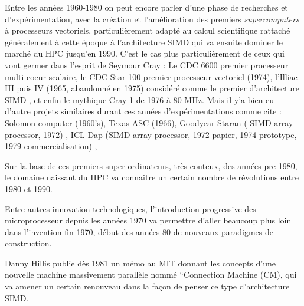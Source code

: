 Entre les années 1960-1980 on peut encore parler d'une phase de recherches et d'expérimentation, avec la création et l'amélioration des premiers \textit{supercomputers} à processeurs vectoriels, particulièrement adapté au calcul scientifique rattaché généralement à cette époque à l'architecture SIMD  qui va ensuite dominer le marché du HPC jusqu'en 1990. C'est le cas plus particulièrement de ceux qui vont germer dans l'esprit de Seymour Cray : Le CDC 6600 premier processeur multi-coeur scalaire, le CDC Star-100 premier processeur vectoriel (1974), l'Illiac III puis IV (1965, abandonné en 1975) considéré comme le premier d'architecture SIMD \autocite{Muraoka2012}, et enfin le mythique Cray-1 de 1976 à  80 MHz. Mais il y'a bien eu d'autre projets similaires durant ces années d'expérimentations comme cite \textcite[387-388]{Steele2011} : Solomon computer (1960's), Texas ASC (1966), Goodyear Staran ( SIMD array processor, 1972) , ICL Dap (SIMD array processor, 1972 papier, 1974 prototype, 1979 commercialisation) , %


Sur la base de ces premiers super ordinateurs, très couteux, des années pre-1980, le domaine naissant du HPC va connaitre un certain nombre de révolutions entre 1980 et 1990.

Entre autres innovation technologiques, l'introduction progressive des microprocesseur depuis les années 1970 va permettre d'aller beaucoup plus loin dans l'invention fin 1970, début des années 80 de nouveaux paradigmes de construction. %

Danny Hillis publie dès 1981 un mémo au MIT donnant les concepts d'une nouvelle machine massivement parallèle nommé “Connection Machine (CM), qui va amener un certain renouveau dans la façon de penser ce type d'architecture SIMD.

